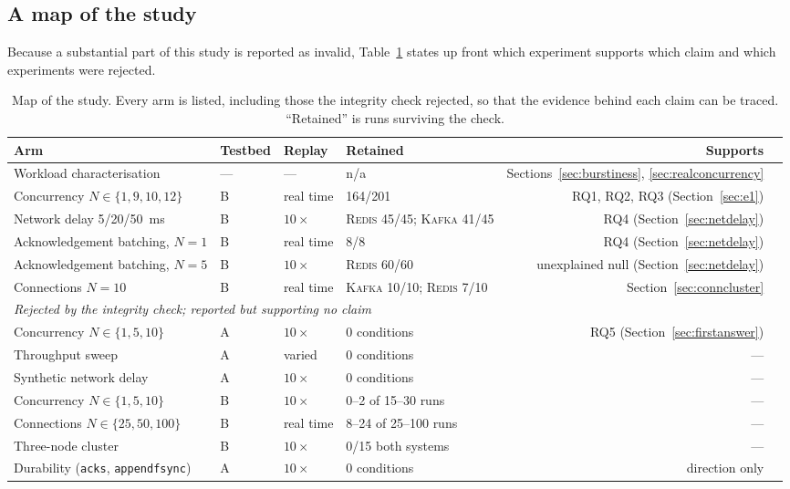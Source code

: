 \documentclass[Afour,sageh,times]{sagej}
\newcommand{\redis}{\textsc{Redis}}
\newcommand{\kafka}{\textsc{Kafka}}
\begin{document}
\subsection{A map of the study}
\label{sec:studymap}

Because a substantial part of this study is reported as invalid, Table~\ref{tab:studymap} states
up front which experiment supports which claim and which experiments were rejected.

\begin{table}[htbp]
\centering
\caption{Map of the study. Every arm is listed, including those the integrity check rejected, so
that the evidence behind each claim can be traced. ``Retained'' is runs surviving the check.}
\label{tab:studymap}
\begin{tabular}{llllr l}
\toprule
Arm & Testbed & Replay & Retained & Supports \\
\midrule
Workload characterisation & --- & --- & n/a & Sections~\ref{sec:burstiness},
\ref{sec:realconcurrency} \\
Concurrency $N \in \{1,9,10,12\}$ & B & real time & 164/201 & RQ1, RQ2, RQ3
(Section~\ref{sec:e1}) \\
Network delay 5/20/50~ms & B & $10\times$ & \redis{} 45/45; \kafka{} 41/45 & RQ4
(Section~\ref{sec:netdelay}) \\
Acknowledgement batching, $N{=}1$ & B & real time & 8/8 & RQ4
(Section~\ref{sec:netdelay}) \\
Acknowledgement batching, $N{=}5$ & B & $10\times$ & \redis{} 60/60 & unexplained null
(Section~\ref{sec:netdelay}) \\
Connections $N{=}10$ & B & real time & \kafka{} 10/10; \redis{} 7/10 &
Section~\ref{sec:conncluster} \\
\midrule
\multicolumn{5}{l}{\emph{Rejected by the integrity check; reported but supporting no claim}} \\
Concurrency $N \in \{1,5,10\}$ & A & $10\times$ & 0 conditions & RQ5
(Section~\ref{sec:firstanswer}) \\
Throughput sweep & A & varied & 0 conditions & --- \\
Synthetic network delay & A & $10\times$ & 0 conditions & --- \\
Concurrency $N \in \{1,5,10\}$ & B & $10\times$ & 0--2 of 15--30 runs & --- \\
Connections $N \in \{25,50,100\}$ & B & real time & 8--24 of 25--100 runs & --- \\
Three-node cluster & B & $10\times$ & 0/15 both systems & --- \\
Durability (\texttt{acks}, \texttt{appendfsync}) & A & $10\times$ & 0 conditions & direction only
\\
\bottomrule
\end{tabular}
\end{table}
\end{document}
